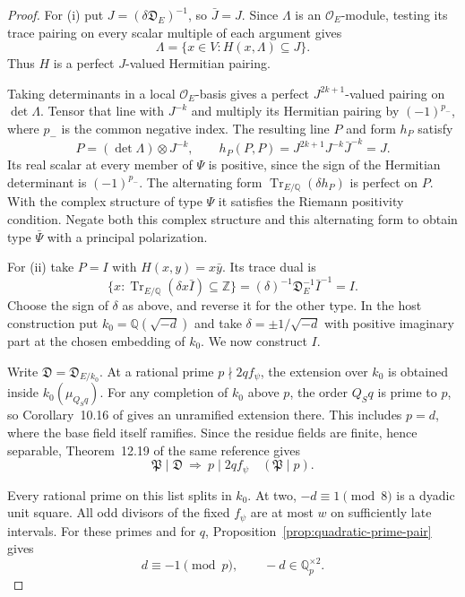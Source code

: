 \begin{proof}
For (i) put \(J=(\delta\mathfrak D_E)^{-1}\), so \(\bar J=J\).
Since \(\Lambda\) is an \(\mathcal O_E\)-module, testing its
trace pairing on every scalar multiple of each argument gives
\[
 \Lambda=\{x\in V:H(x,\Lambda)\subseteq J\}.
\]
Thus \(H\) is a perfect \(J\)-valued Hermitian pairing.

Taking determinants in a local \(\mathcal O_E\)-basis gives a
perfect \(J^{2k+1}\)-valued pairing on \(\det\Lambda\).
Tensor that line with \(J^{-k}\) and multiply its Hermitian
pairing by \((-1)^{p_-}\), where \(p_-\) is the common negative
index. The resulting line \(P\) and form \(h_P\) satisfy
\[
 P=(\det\Lambda)\otimes J^{-k},\qquad
 h_P(P,P)=J^{2k+1}J^{-k}\bar J^{-k}=J.
\]
Its real scalar at every member of \(\Psi\) is positive, since
the sign of the Hermitian determinant is \((-1)^{p_-}\).
The alternating form \(\operatorname{Tr}_{E/\mathbb Q}(\delta h_P)\)
is perfect on \(P\). With the complex structure of type \(\Psi\)
it satisfies the Riemann positivity condition. Negate both this
complex structure and this alternating form to obtain type
\(\bar\Psi\) with a principal polarization.

For (ii) take \(P=I\) with \(H(x,y)=x\bar y\). Its trace dual is
\[
   \{x:\operatorname{Tr}_{E/\mathbb Q}(\delta x\bar I)
                       \subseteq\mathbb Z\}
           =(\delta)^{-1}\mathfrak D_E^{-1}\bar I^{-1}=I .
\]
Choose the sign of \(\delta\) as above, and reverse it for the other
type. In the host construction put \(k_0=\mathbb Q(\sqrt{-d})\)
and take \(\delta=\pm1/\sqrt{-d}\) with positive imaginary part
at the chosen embedding of \(k_0\). We now construct \(I\).

Write \(\mathfrak D=\mathfrak D_{E/k_0}\). At a rational prime
\(p\nmid 2q f_\psi\), the extension over \(k_0\) is obtained
inside \(k_0(\mu_{Q_Sq})\). For any completion of \(k_0\) above
\(p\), the order \(Q_Sq\) is prime to \(p\), so
Corollary~10.16 of \cite{sutherland-local-fields} gives an
unramified extension there. This includes \(p=d\), where the
base field itself ramifies. Since the residue fields are finite,
hence separable, Theorem~12.19 of the same reference gives
\[
  \mathfrak P\mid\mathfrak D\ \Longrightarrow\ 
             p\mid 2qf_\psi\quad(\mathfrak P\mid p) .
\]

Every rational prime on this list splits in \(k_0\).
At two, \(-d\equiv1\pmod8\) is a dyadic unit square.
All odd divisors of the fixed \(f_\psi\) are at most \(w\) on
sufficiently late intervals. For these primes and for \(q\),
Proposition~\ref{prop:quadratic-prime-pair} gives
\[
        d\equiv-1\pmod p,\qquad -d\in\mathbb Q_p^{\times2} .
\]


\end{proof}
